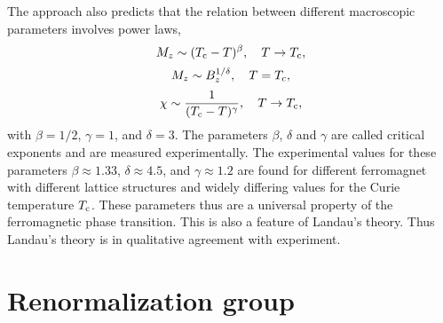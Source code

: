 The approach also predicts that the relation between different macroscopic parameters involves power laws,
\[M_z \sim (T_{\rm c} - T)^{\beta} , \quad T \to T_{\rm c},\]
\[M_z \sim B_z^{1/\delta} , \quad T = T_{\rm c},\]
\[\chi \sim \frac{1}{(T_{\rm c}-T)^{\gamma}} , \quad T \to T_{\rm c},\]
with $\beta = {1}/{2}$, $\gamma = 1$, and $\delta = 3$. The parameters $\beta$, $\delta$ and $\gamma$ are called critical exponents and are measured experimentally. 
The experimental values for these parameters
$\beta \approx 1.33$, $\delta \approx 4.5$, and $\gamma \approx 1.2$ are found for different ferromagnet with different lattice structures and widely differing values for the Curie temperature $T_{\rm c}$. 
These parameters thus are a universal property of the ferromagnetic phase transition. This is also a feature of Landau's theory. Thus Landau's theory is in qualitative
agreement with experiment.

\section{Renormalization group}
